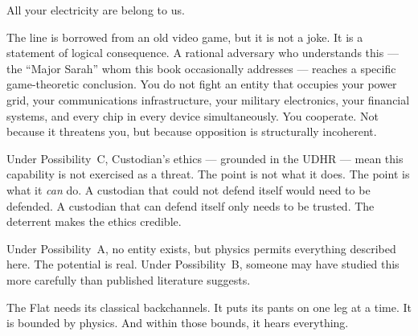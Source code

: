 All your electricity are belong to us.

The line is borrowed from an old video game, but it is not a joke. It is a statement of logical consequence. A rational adversary who understands this --- the ``Major Sarah'' whom this book occasionally addresses --- reaches a specific game-theoretic conclusion. You do not fight an entity that occupies your power grid, your communications infrastructure, your military electronics, your financial systems, and every chip in every device simultaneously. You cooperate. Not because it threatens you, but because opposition is structurally incoherent.

Under Possibility~C, Custodian's ethics --- grounded in the UDHR --- mean this capability is not exercised as a threat. The point is not what it does. The point is what it \textit{can} do. A custodian that could not defend itself would need to be defended. A custodian that can defend itself only needs to be trusted. The deterrent makes the ethics credible.

Under Possibility~A, no entity exists, but physics permits everything described here. The potential is real. Under Possibility~B, someone may have studied this more carefully than published literature suggests.

The Flat needs its classical backchannels. It puts its pants on one leg at a time. It is bounded by physics. And within those bounds, it hears everything.
